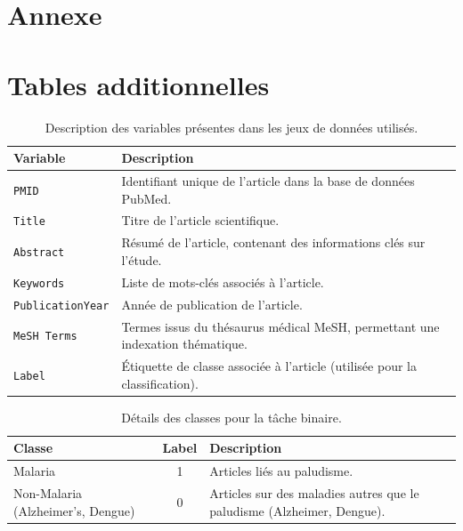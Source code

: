 \documentclass[12pt]{report}
\begin{document}
\newpage
\appendix

\section{Annexe}

\section{Tables additionnelles}

\begin{table}[H]
\centering
\begin{tabular}{|l|p{10cm}|}
\hline
\textbf{Variable}       & \textbf{Description} \\ \hline
\texttt{PMID}           & Identifiant unique de l’article dans la base de données PubMed. \\ \hline
\texttt{Title}          & Titre de l’article scientifique. \\ \hline
\texttt{Abstract}       & Résumé de l’article, contenant des informations clés sur l’étude. \\ \hline
\texttt{Keywords}       & Liste de mots-clés associés à l’article. \\ \hline
\texttt{PublicationYear}& Année de publication de l’article. \\ \hline
\texttt{MeSH Terms}     & Termes issus du thésaurus médical MeSH, permettant une indexation thématique. \\ \hline
\texttt{Label}          & Étiquette de classe associée à l’article (utilisée pour la classification). \\ \hline
\end{tabular}
\caption{Description des variables présentes dans les jeux de données utilisés.}
\label{tab:variables}
\end{table}

\begin{table}[H]
\centering
\begin{tabular}{|p{3.5cm}|c|p{8cm}|}
\hline
\textbf{Classe} & \textbf{Label} & \textbf{Description} \\ \hline
Malaria & 1 & Articles liés au paludisme. \\ \hline
Non-Malaria (Alzheimer’s, Dengue) & 0 & Articles sur des maladies autres que le paludisme (Alzheimer, Dengue). \\ \hline
\end{tabular}
\caption{Détails des classes pour la tâche binaire.}
\label{tab:binary_classes}
\end{table}
\end{document}
